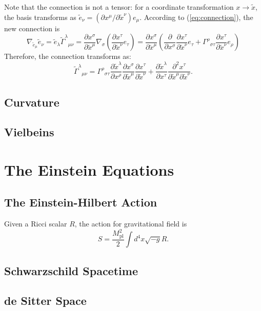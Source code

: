 \documentclass[aps,prb,superscriptaddress,nofootinbib]{revtex4}
\begin{document}
Note that the connection is not a tensor: for a coordinate transformation $x \rightarrow \tilde x$, the basis transforms as $\tilde e_\nu = (\partial x^\mu/\partial \tilde x^\nu) e_\mu$.
According to (\ref{eq:connection}), the new connection is
\begin{equation}
	\nabla_{\tilde e_\mu} \tilde e_\nu 
	= \tilde{e}_\lambda {\tilde \Gamma^\lambda}_{\mu\nu} 
	= \frac{\partial x^\sigma}{\partial \tilde{x}^\mu} \nabla_\sigma \left(\frac{\partial x^\tau}{\partial\tilde x^\nu} e_\tau\right)
	= \frac{\partial x^\sigma}{\partial \tilde{x}^\mu} \left(\frac{\partial}{\partial x^\sigma}\frac{\partial x^\tau}{\partial\tilde x^\nu} e_\tau + {\Gamma^\rho}_{\sigma\tau}\frac{\partial x^\tau}{\partial\tilde x^\nu}e_\rho\right)
\end{equation}
Therefore, the connection transforms as:
\begin{equation}
	{\tilde \Gamma^\lambda}_{\mu\nu}
	= {\Gamma^\rho}_{\sigma\tau} \frac{\partial \tilde x^\lambda}{\partial x^\rho} \frac{\partial x^\sigma}{\partial \tilde{x}^\mu} \frac{\partial x^\tau}{\partial\tilde x^\nu} + \frac{\partial \tilde x^\lambda}{\partial x^\tau} \frac{\partial^2 x^\tau}{\partial \tilde x^\mu \partial \tilde x^\nu}.
\end{equation}



\subsection{Curvature}


\subsection{Vielbeins}



\section{The Einstein Equations}


\subsection{The Einstein-Hilbert Action}

Given a Ricci scalar $R$, the action for gravitational field is
\begin{equation}
	S = \frac{M^2_\mathrm{pl}}{2} \int d^4 x \sqrt{-g} R.
\end{equation}

\subsection{Schwarzschild Spacetime}

\subsection{de Sitter Space}
\end{document}
